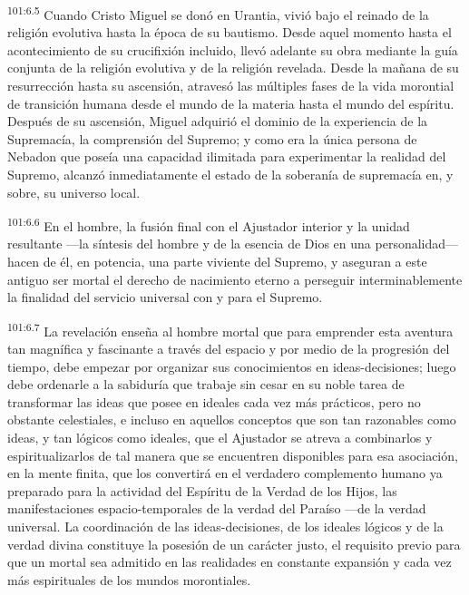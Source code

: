 \par
\textsuperscript{101:6.5} Cuando Cristo Miguel se donó en Urantia, vivió bajo el reinado de la religión evolutiva hasta la época de su bautismo. Desde aquel momento hasta el acontecimiento de su crucifixión incluido, llevó adelante su obra mediante la guía conjunta de la religión evolutiva y de la religión revelada. Desde la mañana de su resurrección hasta su ascensión, atravesó las múltiples fases de la vida morontial de transición humana desde el mundo de la materia hasta el mundo del espíritu. Después de su ascensión, Miguel adquirió el dominio de la experiencia de la Supremacía, la comprensión del Supremo; y como era la única persona de Nebadon que poseía una capacidad ilimitada para experimentar la realidad del Supremo, alcanzó inmediatamente el estado de la soberanía de supremacía en, y sobre, su universo local.

\par
\textsuperscript{101:6.6} En el hombre, la fusión final con el Ajustador interior y la unidad resultante ---la síntesis del hombre y de la esencia de Dios en una personalidad--- hacen de él, en potencia, una parte viviente del Supremo, y aseguran a este antiguo ser mortal el derecho de nacimiento eterno a perseguir interminablemente la finalidad del servicio universal con y para el Supremo.

\par
\textsuperscript{101:6.7} La revelación enseña al hombre mortal que para emprender esta aventura tan magnífica y fascinante a través del espacio y por medio de la progresión del tiempo, debe empezar por organizar sus conocimientos en ideas-decisiones; luego debe ordenarle a la sabiduría que trabaje sin cesar en su noble tarea de transformar las ideas que posee en ideales cada vez más prácticos, pero no obstante celestiales, e incluso en aquellos conceptos que son tan razonables como ideas, y tan lógicos como ideales, que el Ajustador se atreva a combinarlos y espiritualizarlos de tal manera que se encuentren disponibles para esa asociación, en la mente finita, que los convertirá en el verdadero complemento humano ya preparado para la actividad del Espíritu de la Verdad de los Hijos, las manifestaciones espacio-temporales de la verdad del Paraíso ---de la verdad universal. La coordinación de las ideas-decisiones, de los ideales lógicos y de la verdad divina constituye la posesión de un carácter justo, el requisito previo para que un mortal sea admitido en las realidades en constante expansión y cada vez más espirituales de los mundos morontiales.

